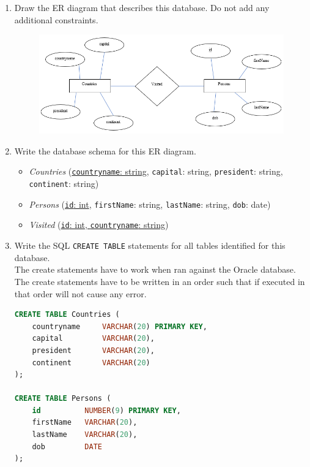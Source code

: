 \documentclass[letterpaper, 11pt]{article}
\begin{document}
\begin{enumerate}[label={\alph*})]
    \item Draw the ER diagram that describes this database. Do not add any additional constraints.
    \begin{figure}[H]
        \centering
        \includegraphics[scale=0.7]{hw2-2a.png}
    \end{figure}
    \item Write the database schema for this ER diagram.

    \begin{itemize}
        \item \textit{Countries} (\ul{\texttt{countryname}: string}, \texttt{capital}: string, \texttt{president}: string, \texttt{continent}: string)
        \item \textit{Persons} (\ul{\texttt{id}: int}, \texttt{firstName}: string, \texttt{lastName}: string, \texttt{dob}: date)
        \item \textit{Visited} (\ul{\texttt{id}: int, \texttt{countryname}: string})
    \end{itemize}
    
    \item Write the SQL \texttt{CREATE TABLE} statements for all tables identified for this database.\\
    The create statements have to work when ran against the Oracle database.\\
    The create statements have to be written in an order such that if executed in that order will not cause any error.
\begin{tcolorbox}
    \begin{lstlisting}[language=SQL]
CREATE TABLE Countries (
    countryname     VARCHAR(20) PRIMARY KEY,
    capital         VARCHAR(20),
    president       VARCHAR(20),
    continent       VARCHAR(20)
);

CREATE TABLE Persons (
    id          NUMBER(9) PRIMARY KEY,
    firstName   VARCHAR(20),
    lastName    VARCHAR(20),
    dob         DATE
);


\end{lstlisting}
\end{tcolorbox}
\end{enumerate}
\end{document}

